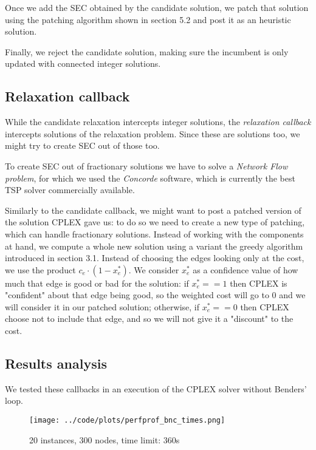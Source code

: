 Once we add the SEC obtained by the candidate solution, we patch that solution using the patching algorithm shown in section 5.2 and post it as an heuristic solution.

Finally, we reject the candidate solution, making sure the incumbent is only updated with connected integer solutions.

\subsection{Relaxation callback}
While the candidate relaxation intercepts integer solutions, the \textit{relaxation callback} intercepts solutions of the relaxation problem. Since these are solutions too, we might try to create SEC out of those too.

To create SEC out of fractionary solutions we have to solve a \textit{Network Flow problem}, for which we used the \textit{Concorde} software, which is currently the best TSP solver commercially available.

Similarly to the candidate callback, we might want to post a patched version of the solution CPLEX gave us: to do so we need to create a new type of patching, which can handle fractionary solutions. Instead of working with the components at hand, we compute a whole new solution using a variant the greedy algorithm introduced in section 3.1. Instead of choosing the edges looking only at the cost, we use the product $c_e \cdot (1 - x^*_e)$. We consider $x^*_e$ as a confidence value of how much that edge is good or bad for the solution: if $x^*_e == 1$ then CPLEX is "confident" about that edge being good, so the weighted cost will go to 0 and we will consider it in our patched solution; otherwise, if $x^*_e == 0$ then CPLEX choose not to include that edge, and so we will not give it a "discount" to the cost.

\subsection{Results analysis}

We tested these callbacks in an execution of the CPLEX solver without Benders' loop.

\FloatBarrier
\begin{figure}[h]
    \centering
    \texttt{[image: ../code/plots/perfprof\_bnc\_times.png]}
    \caption*{20 instances, 300 nodes, time limit: 360s}
\end{figure}
\FloatBarrier

